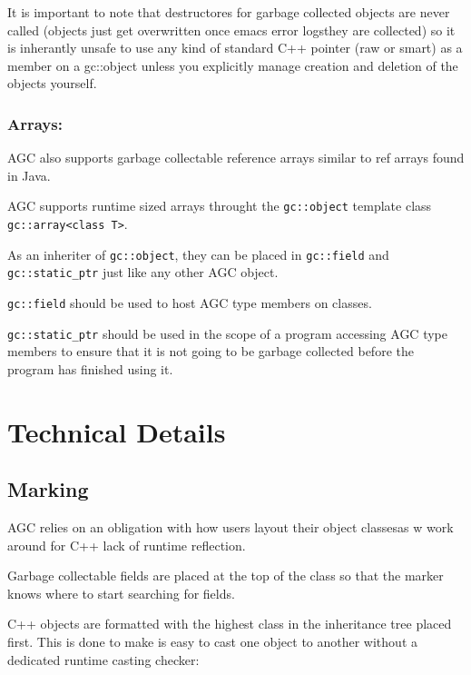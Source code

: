\documentclass[11pt]{article}
\begin{document}
It is important to note that destructores for garbage collected objects are never called (objects just get overwritten once  emacs error logsthey are collected)
so it is inherantly unsafe to use any kind of standard C++ pointer (raw or smart) as a member on a gc::object unless you explicitly manage
creation and deletion of the objects yourself.
\subsubsection{Arrays:}
\label{sec:orgb60ee48}
AGC also supports garbage collectable reference arrays similar to ref arrays found in Java.

AGC supports runtime sized arrays throught the \texttt{gc::object} template class \texttt{gc::array<class T>}.

As an inheriter of \texttt{gc::object}, they can be placed in \texttt{gc::field} and \texttt{gc::static\_ptr} just like any other AGC object.

\texttt{gc::field} should be used to host AGC type members on classes.

\texttt{gc::static\_ptr} should be used in the scope of a program accessing AGC type members to ensure that it is not going to be garbage
collected before the program has finished using it.
\section{Technical Details}
\label{sec:orgf98330b}
\subsection{Marking}
\label{sec:orgbb9b100}
AGC relies on an obligation with how users layout their object classesas w work around for C++ lack of runtime reflection.

Garbage collectable fields are placed at the top of the class so that the marker knows where to start searching for fields.

C++ objects are formatted with the highest class in the inheritance tree placed first. This is done to make is easy to cast
one object to another without a dedicated runtime casting checker:
\end{document}
